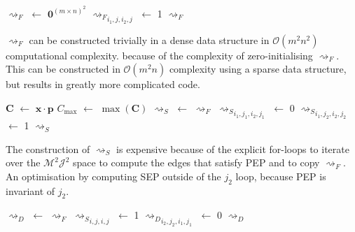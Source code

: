 \begin{algorithm}[H]
	\caption{}
	\begin{algorithmic}[1]
			\State $\rightsquigarrow_F$ $\gets$ $\mathbf{0}^{(m\times n)^2}$
							\State ${\rightsquigarrow_F}_{i_1,j,i_2,j}$ $\gets$ 1
						\EndIf
					\EndFor
				\EndFor
			\EndFor
			\State \Return $\rightsquigarrow_F$
		\EndFunction
	\end{algorithmic}
\end{algorithm}

$\rightsquigarrow_F$ can be constructed trivially in a dense data structure in $\mathcal{O}(m^2n^2)$ computational complexity. because of the complexity of zero-initialising $\rightsquigarrow_F$. This can be constructed in $\mathcal{O}(m^2n)$ complexity using a sparse data structure, but results in greatly more complicated code.

\begin{algorithm}[H]
	\caption{}
	\begin{algorithmic}[1]
			\State $\mathbf{C}$ $\gets$ $\mathbf{x}\cdot\mathbf{p}$
			\State $C_{\max}$ $\gets$ $\max(\mathbf{C})$
			\State $\rightsquigarrow_S$ $\gets$ $\rightsquigarrow_F$
									\State ${\rightsquigarrow_S}_{i_1,j_1,i_2,j_1}$ $\gets$ 0
								\EndIf
										\State ${\rightsquigarrow_S}_{i_1,j_2,i_2,j_2}$ $\gets$ 1
									\EndIf
								\EndFor
							\EndFor
						\EndIf
					\EndFor
				\EndIf
			\EndFor
			\State \Return $\rightsquigarrow_S$
		\EndFunction
	\end{algorithmic}
\end{algorithm}

The construction of $\rightsquigarrow_S$ is expensive because of the explicit for-loops to iterate over the $\mathcal{M}^2\mathcal{J}^2$ space to compute the edges that satisfy PEP and to copy $\rightsquigarrow_F$. An optimisation by computing SEP outside of the $j_2$ loop, because PEP is invariant of $j_2$.

\begin{algorithm}[H]
	\caption{}
	\begin{algorithmic}[1]
			\State $\rightsquigarrow_D$ $\gets$ $\rightsquigarrow_F$
				\State ${\rightsquigarrow_S}_{i,j,i,j}$ $\gets$ 1
			\EndFor
						\State ${\rightsquigarrow_D}_{i_2,j_2,i_1,j_1}$ $\gets$ 0				
					\EndFor
				\EndFor
			\EndFor
			\State \Return $\rightsquigarrow_D$
		\EndFunction
	\end{algorithmic}
\end{algorithm}


